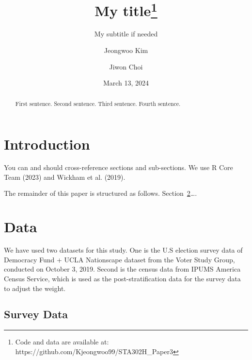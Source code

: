 \documentclass[
  letterpaper,
  DIV=11,
  numbers=noendperiod]{scrartcl}
\title{My title\thanks{Code and data are available at:
https://github.com/Kjeongwoo99/STA302H\_Paper3}}
\subtitle{My subtitle if needed}
\author{Jeongwoo Kim \and Jiwon Choi}
\date{March 13, 2024}
\begin{document}
\maketitle
\begin{abstract}
First sentence. Second sentence. Third sentence. Fourth sentence.
\end{abstract}
\ifdefined\Shaded\renewenvironment{Shaded}{\begin{tcolorbox}[breakable, interior hidden, frame hidden, enhanced, sharp corners, boxrule=0pt, borderline west={3pt}{0pt}{shadecolor}]}{\end{tcolorbox}}\fi

\hypertarget{introduction}{%
\section{Introduction}\label{introduction}}

You can and should cross-reference sections and sub-sections. We use R
Core Team (2023) and Wickham et al. (2019).

The remainder of this paper is structured as follows.
Section~\ref{sec-data}\ldots.

\hypertarget{sec-data}{%
\section{Data}\label{sec-data}}

We have used two datasets for this study. One is the U.S election survey
data of Democracy Fund + UCLA Nationscape dataset from the Voter Study
Group, conducted on October 3, 2019. Second is the census data from
IPUMS America Census Service, which is used as the post-stratification
data for the survey data to adjust the weight.

\hypertarget{survey-data}{%
\subsection{Survey Data}\label{survey-data}}
\end{document}
